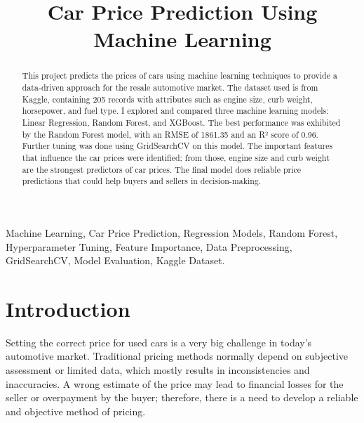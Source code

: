 \documentclass[journal]{IEEEtran}
\begin{document}
\title{Car Price Prediction Using Machine Learning}

\author{
    
    
     
}



\maketitle

\thispagestyle{fancy}

\begin{abstract}
This project predicts the prices of cars using machine learning techniques to provide a data-driven approach for the resale automotive market. The dataset used is from Kaggle, containing 205 records with attributes such as engine size, curb weight, horsepower, and fuel type. I explored and compared three machine learning models: Linear Regression, Random Forest, and XGBoost. The best performance was exhibited by the Random Forest model, with an RMSE of 1861.35 and an R² score of 0.96. Further tuning was done using GridSearchCV on this model. The important features that influence the car prices were identified; from those, engine size and curb weight are the strongest predictors of car prices. The final model does reliable price predictions that could help buyers and sellers in decision-making.
\end{abstract}

\begin{IEEEkeywords}
Machine Learning, Car Price Prediction, Regression Models, Random Forest, Hyperparameter Tuning, Feature Importance, Data Preprocessing, GridSearchCV, Model Evaluation, Kaggle Dataset.
\end{IEEEkeywords}


\section{Introduction}
Setting the correct price for used cars is a very big challenge in today's automotive market. Traditional pricing methods normally depend on subjective assessment or limited data, which mostly results in inconsistencies and inaccuracies. A wrong estimate of the price may lead to financial losses for the seller or overpayment by the buyer; therefore, there is a need to develop a reliable and objective method of pricing.
\end{document}
